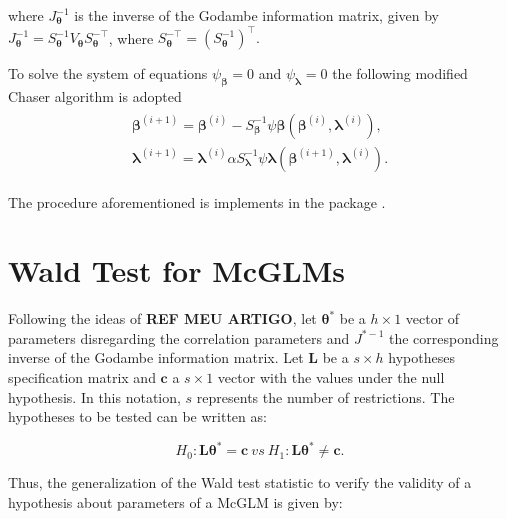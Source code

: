 \documentclass[article]{jss}\usepackage[]{graphicx}\usepackage[]{xcolor}
\begin{document}
\noindent where $J_{\boldsymbol{\theta}}^{-1}$ is the inverse of the Godambe information matrix, given by $J_{\boldsymbol{\theta}}^{-1} = S_{\boldsymbol{\theta}}^{-1} V_{\boldsymbol{\theta}} S_{\boldsymbol{\theta}}^{-\top}$, where $S_{\boldsymbol{\theta}}^{-\top} = (S_{\boldsymbol{\theta}}^{-1})^{\top}.$

To solve the system of equations $\psi_{\boldsymbol{\beta}} = 0$ and $\psi_{\boldsymbol{\lambda}} = 0$ the following modified Chaser algorithm is adopted 
$$
\begin{aligned}
\begin{matrix}
\boldsymbol{\beta}^{(i+1)} = \boldsymbol{\beta}^{(i)}- S_{\boldsymbol{\beta}}^{-1} \psi \boldsymbol{\beta} (\boldsymbol{\beta}^{(i)}, \boldsymbol{\lambda}^{(i)}), \\ 
\boldsymbol{\lambda}^{(i+1)} = \boldsymbol{\lambda}^{(i)}\alpha S_{\boldsymbol{\lambda}}^{-1} \psi \boldsymbol{\lambda} (\boldsymbol{\beta}^{(i+1)}, \boldsymbol{\lambda}^{(i)}).
\end{matrix}
\end{aligned}
$$

The procedure aforementioned is implements in the  package \citep{mcglm}.


\section{Wald Test for McGLMs}\label{sec:wald}

Following the ideas of \textbf{REF MEU ARTIGO}, let $\boldsymbol{\theta^{*}}$ be a $h \times 1$ vector of parameters disregarding the correlation parameters and $J^{\boldsymbol{*}-1}$ the corresponding inverse of the Godambe information matrix. Let $\boldsymbol{L}$ be a $s \times h$ hypotheses specification matrix and $\boldsymbol{c}$ a $s \times 1$ vector with the values under the null hypothesis. In this notation, $s$ represents the number of restrictions. The hypotheses to be tested can be written as:

\begin{equation}
\label{eq:hipoteses_wald}
H_0: \boldsymbol{L}\boldsymbol{\theta^{*}} = \boldsymbol{c} \ vs \ H_1: \boldsymbol{L}\boldsymbol{\theta^{*}} \neq \boldsymbol{c}. 
\end{equation}

\noindent Thus, the generalization of the Wald test statistic to verify the validity of a hypothesis about parameters of a McGLM is given by:
\end{document}
